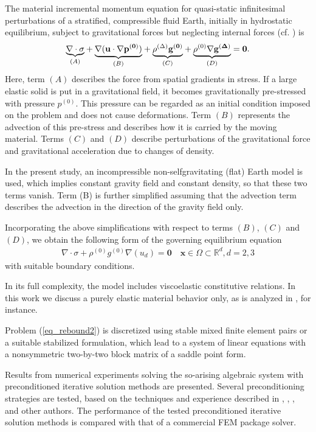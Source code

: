 \documentclass{report}
\begin{document}
The material incremental momentum equation for quasi-static infinitesimal
perturbations of a stratified, compressible fluid Earth, initially in
hydrostatic equilibrium, subject to gravitational forces but neglecting
internal forces (cf. \cite{KlemannWuWolf}) is
$$
\underset{(A)}{\underbrace{\nabla\cdot\sigma}} +
\underset{(B)}{\underbrace{\nabla(\bf{u}\cdot\nabla p^{(0)})}} +
\underset{(C)}{\underbrace{\rho^{(\Delta)}\bf{g}^{(0)}}} +
\underset{(D)}{\underbrace{\rho^{(0)}\nabla\bf{g}^{(\Delta)}}} = \bf{0}.
$$
Here, term $(A)$ describes the force from spatial gradients in stress. If
a large elastic solid is put in a gravitational field, it becomes
gravitationally pre-stressed with pressure $p^{(0)}$. This pressure can
be regarded as an initial condition imposed on the problem and does not
cause deformations. Term $(B)$ represents the advection of this
pre-stress and describes how it is carried by the moving
material. Terms $(C)$ and $(D)$ describe perturbations of the
gravitational force and gravitational acceleration due to changes of
density.

In the present study, an incompressible non-selfgravitating (flat) Earth
model is used, which implies constant gravity field and constant density,
so that these two terms vanish. Term (B)
is further simplified assuming that the advection term describes the
advection in the direction of the gravity field only.

Incorporating the above simplifications with respect to terms
$(B)$, $(C)$ and $(D)$, we obtain the following form of the governing
equilibrium equation
\begin{equation}
\begin{array}{l}
\nabla\cdot \sigma +
\rho^{(0)}g^{(0)} \nabla(u_d) = \mathbf{0} \quad
\mathbf{x}\in\Omega\subset\mathbb{R}^d, d=2,3
\end{array}
\label{eq_rebound2}
\end{equation}
with suitable boundary conditions.

In its full complexity, the model includes viscoelastic constitutive
relations. In this work we discuss a purely elastic material behavior
only, as is analyzed in \cite{KlemannWuWolf}, for instance.

Problem (\ref{eq_rebound2}) is discretized using stable mixed finite
element pairs or a suitable stabilized formulation,
which lead to a system of linear equations with a nonsymmetric
two-by-two block matrix of a saddle point form.

Results from numerical experiments solving the so-arising algebraic
system with preconditioned iterative solution methods are presented.
Several preconditioning strategies are tested, based on the techniques
and experience described in \cite{Klawonn}, \cite{elman},
\cite{AxelssonNeytcheva}, \cite{AxelssonNeytcheva1} and other authors.
The performance of the tested preconditioned iterative solution methods
is compared with that of a commercial FEM package solver.
\end{document}
